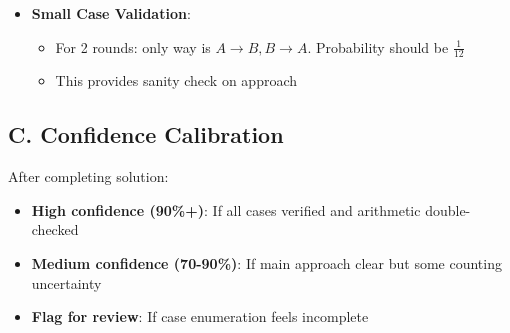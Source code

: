 \documentclass[]{article}
\begin{document}
\begin{verificationbox}
\begin{itemize}[leftmargin=*]
    \item \textbf{Small Case Validation}:
    \begin{itemize}
        \item For 2 rounds: only way is $A \to B, B \to A$. Probability should be $\frac{1}{12}$
        \item This provides sanity check on approach
    \end{itemize}
\end{itemize}

\subsection*{C. Confidence Calibration}
After completing solution:
\begin{itemize}
    \item \textbf{High confidence (90\%+)}: If all cases verified and arithmetic double-checked
    \item \textbf{Medium confidence (70-90\%)}: If main approach clear but some counting uncertainty
    \item \textbf{Flag for review}: If case enumeration feels incomplete
\end{itemize}
\end{verificationbox}
\end{document}
